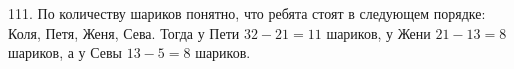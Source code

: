111. По количеству шариков понятно, что ребята стоят в следующем порядке: Коля, Петя, Женя, Сева. Тогда у Пети $32-21=11$ шариков, у Жени $21-13=8$ шариков, а у Севы $13-5=8$ шариков.\\

